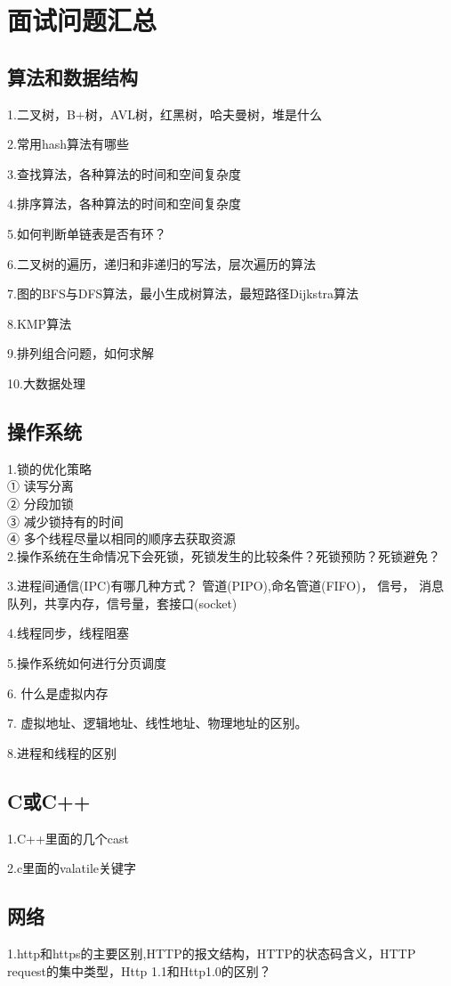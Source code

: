 \section{面试问题汇总}

\subsection{算法和数据结构}
1.二叉树，B+树，AVL树，红黑树，哈夫曼树，堆是什么

2.常用hash算法有哪些

3.查找算法，各种算法的时间和空间复杂度

4.排序算法，各种算法的时间和空间复杂度

5.如何判断单链表是否有环？

6.二叉树的遍历，递归和非递归的写法，层次遍历的算法

7.图的BFS与DFS算法，最小生成树算法，最短路径Dijkstra算法

8.KMP算法

9.排列组合问题，如何求解

10.大数据处理

\subsection{操作系统}
1.锁的优化策略\\
① 读写分离\\
② 分段加锁\\
③ 减少锁持有的时间\\
④ 多个线程尽量以相同的顺序去获取资源\\

2.操作系统在生命情况下会死锁，死锁发生的比较条件？死锁预防？死锁避免？

3.进程间通信(IPC)有哪几种方式？
管道(PIPO),命名管道(FIFO)， 信号， 消息队列，共享内存，信号量，套接口(socket)

4.线程同步，线程阻塞

5.操作系统如何进行分页调度

6. 什么是虚拟内存

7. 虚拟地址、逻辑地址、线性地址、物理地址的区别。

8.进程和线程的区别
\subsection{C或C++}
1.C++里面的几个cast

2.c里面的valatile关键字
\subsection{网络}
1.http和https的主要区别,HTTP的报文结构，HTTP的状态码含义，HTTP request的集中类型，Http 1.1和Http1.0的区别？

